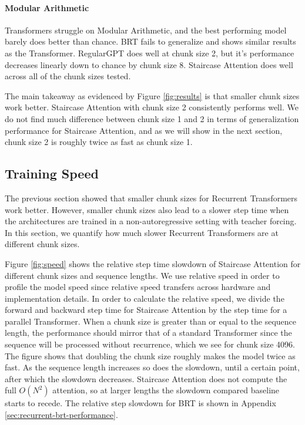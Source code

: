     \paragraph{Modular Arithmetic} Transformers struggle on Modular Arithmetic, and the best performing model barely does better than chance. BRT fails to generalize and shows similar results as the Transformer. RegularGPT does well at chunk size 2, but it's performance decreases linearly down to chance by chunk size 8. Staircase Attention does well across all of the chunk sizes tested.
    
    The main takeaway as evidenced by Figure \ref{fig:results} is that smaller chunk sizes work better. Staircase Attention with chunk size 2 consistently performs well. We do not find much difference between chunk size 1 and 2 in terms of generalization performance for Staircase Attention, and as we will show in the next section, chunk size 2 is roughly twice as fast as chunk size 1.
    
    
    \subsection{Training Speed} \label{sec:recurrent-training-speed}
    The previous section showed that smaller chunk sizes for Recurrent Transformers work better. However, smaller chunk sizes also lead to a slower step time when the architectures are trained in a non-autoregressive setting with teacher forcing. In this section, we quantify how much slower Recurrent Transformers are at different chunk sizes.
    
    Figure \ref{fig:speed} shows the relative step time slowdown of Staircase Attention for different chunk sizes and sequence lengths. We use relative speed in order to profile the model speed since relative speed transfers across hardware and implementation details. In order to calculate the relative speed, we divide the forward and backward step time for Staircase Attention by the step time for a parallel Transformer.  When a chunk size is greater than or equal to the sequence length, the performance should mirror that of a standard Transformer since the sequence will be processed without recurrence, which we see for chunk size 4096. The figure shows that doubling the chunk size roughly makes the model twice as fast. As the sequence length increases so does the slowdown, until a certain point, after which the slowdown decreases. Staircase Attention does not compute the full $O(N^2)$ attention, so at larger lengths the slowdown compared baseline starts to recede. The relative step slowdown for BRT is shown in Appendix \ref{sec:recurrent-brt-performance}.
    
